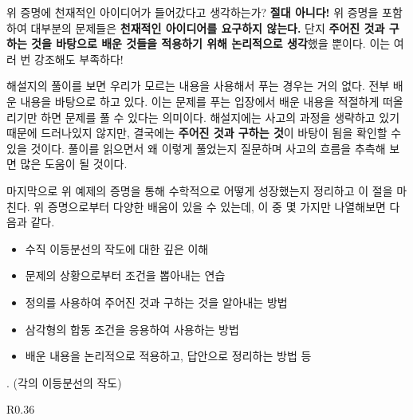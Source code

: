 위 증명에 천재적인 아이디어가 들어갔다고 생각하는가? \textbf{절대 아니다!} 위 증명을 포함하여 대부분의 문제들은 \textbf{천재적인 아이디어를 요구하지 않는다.} 단지 \textbf{주어진 것과 구하는 것을 바탕으로 배운 것들을 적용하기 위해 논리적으로 생각}했을 뿐이다. 이는 여러 번 강조해도 부족하다!

해설지의 풀이를 보면 우리가 모르는 내용을 사용해서 푸는 경우는 거의 없다. 전부 배운 내용을 바탕으로 하고 있다. 이는 문제를 푸는 입장에서 배운 내용을 적절하게 떠올리기만 하면 문제를 풀 수 있다는 의미이다. 해설지에는 사고의 과정을 생략하고 있기 때문에 드러나있지 않지만, 결국에는 \textbf{주어진 것과 구하는 것}이 바탕이 됨을 확인할 수 있을 것이다. 풀이를 읽으면서 왜 이렇게 풀었는지 질문하며 사고의 흐름을 추측해 보면 많은 도움이 될 것이다.

마지막으로 위 예제의 증명을 통해 수학적으로 어떻게 성장했는지 정리하고 이 절을 마친다. 위 증명으로부터 다양한 배움이 있을 수 있는데, 이 중 몇 가지만 나열해보면 다음과 같다.
\begin{itemize}
    \item 수직 이등분선의 작도에 대한 깊은 이해
    \item 문제의 상황으로부터 조건을 뽑아내는 연습
    \item 정의를 사용하여 주어진 것과 구하는 것을 알아내는 방법
    \item 삼각형의 합동 조건을 응용하여 사용하는 방법
    \item 배운 내용을 논리적으로 적용하고, 답안으로 정리하는 방법 등
\end{itemize}

\ex. (각의 이등분선의 작도)

\begin{wrapfigure}{R}{0.36\textwidth}
    \vspace*{-50px}
\end{wrapfigure}

